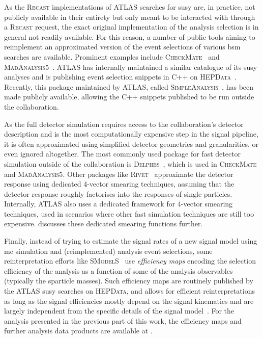 As the \textsc{Recast} implementations of ATLAS searches for \gls{susy} are, in practice, not publicly available in their entirety but only meant to be interacted with through a \textsc{Recast} request, the exact original implementation of the analysis selection is in general not readily available. For this reason, a number of public tools aiming to reimplement an approximated version of the event selections of various \gls{bsm} searches are available. Prominent examples include \textsc{CheckMate}~\cite{Checkmate2:2016npn,Checkmate:2013wra} and \textsc{MadAnalysis5}~\cite{MadAnalysis:2012fm}. ATLAS has internally maintained a similar catalogue of its \gls{susy} analyses and is publishing event selection snippets in C++ on \textsc{HEPData}~\cite{HEPData:2017ypu}. Recently, this package maintained by ATLAS, called \textsc{SimpleAnalysis}~\cite{simpleanalysis}, has been made publicly available, allowing the C++ snippets published to be run outside the collaboration.

As the full detector simulation requires access to the collaboration's detector description and is the most computationally expensive step in the signal pipeline, it is often approximated using simplified detector geometries and granularities, or even ignored altogether. 
The most commonly used package for fast detector simulation outside of the collaboration is \textsc{Delphes}~\cite{Delphes:2009tx}, which is used in \eg \textsc{CheckMate} and \textsc{MadAnalysis5}. Other packages like \eg \textsc{Rivet}~\cite{Rivet1:2010ar,Rivet2:2019stt} approximate the detector response using dedicated 4-vector smearing techniques, assuming that the detector response roughly factorises into the responses of single particles. Internally, ATLAS also uses a dedicated framework for 4-vector smearing techniques, used in scenarios where other fast simulation techniques are still too expensive.  discusses these dedicated smearing functions further.

Finally, instead of trying to estimate the signal rates of a new signal model using \gls{mc} simulation and (reimplemented) analysis event selections, some reinterpretation efforts like \eg \textsc{SModelS}~\cite{SModelS1:2013mwa,SModelS2:2017neo} use \textit{efficiency maps} encoding the selection efficiency of the analysis as a function of some of the analysis observables (typically the sparticle masses). Such efficiency maps are routinely published by the ATLAS \gls{susy} searches on \textsc{HEPData}, and allows for efficient reinterpretations as long as the signal efficiencies mostly depend on the signal kinematics and are largely independent from the specific details of the signal model~\cite{SModelS1:2013mwa}. For the analysis presented in the previous part of this work, the efficiency maps and further analysis data products are available at \cite{HEPdata_1Lbb}. 

